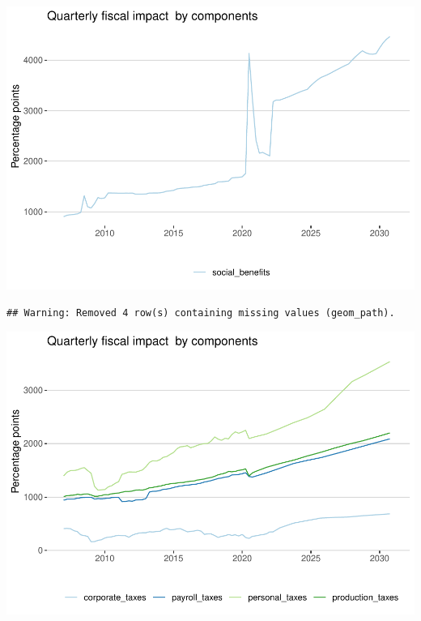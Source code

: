\documentclass[
]{article}
\begin{document}
\begin{center}\includegraphics{projections_files/figure-latex/social benefits levels-1} \end{center}

\begin{verbatim}
## Warning: Removed 4 row(s) containing missing values (geom_path).
\end{verbatim}

\begin{center}\includegraphics{projections_files/figure-latex/tax levels-1} \end{center}
\end{document}
